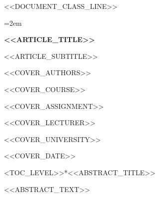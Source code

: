 <<DOCUMENT_CLASS_LINE>>
\usepackage[a4paper,margin=1.55cm]{geometry}
\usepackage{fontspec}
\usepackage{polyglossia}
\setmainlanguage{<<MAIN_LANGUAGE>>}
\setmainfont{Times New Roman}
\newfontfamily{}
\newfontfamily{}
\newfontfamily{}
\usepackage{graphicx}
\usepackage{booktabs}
\usepackage{array}
\usepackage{amsmath}
\usepackage{fancyhdr}
\usepackage{setspace}
\usepackage{titlesec}
\usepackage{enumitem}
\usepackage[hidelinks]{hyperref}
\pagestyle{fancy}
\setlength{\headheight}{15pt}
\fancyhf{}
\fancyfoot[C]{\thepage}
\setlength{\parindent}{1.25em}
\setlength{\parskip}{0pt}
\emergencystretch=2em
\sloppy
\renewcommand{\contentsname}{<<CONTENTS_NAME>>}

\thispagestyle{empty}
\begin{center}
\vspace*{3.5cm}
{\Huge\bfseries <<ARTICLE_TITLE>>\par}
\vspace{0.7cm}
{\Large <<ARTICLE_SUBTITLE>>\par}
\vspace{1.4cm}
{\Large <<COVER_AUTHORS>>\par}
\vspace{0.5cm}
{\large <<COVER_COURSE>>\par}
{\large <<COVER_ASSIGNMENT>>\par}
{\large <<COVER_LECTURER>>\par}
\vfill
{\large <<COVER_UNIVERSITY>>\par}
{\large <<COVER_DATE>>\par}
\end{center}
\clearpage
\<<TOC_LEVEL>>*{<<ABSTRACT_TITLE>>}
<<ABSTRACT_TEXT>>

